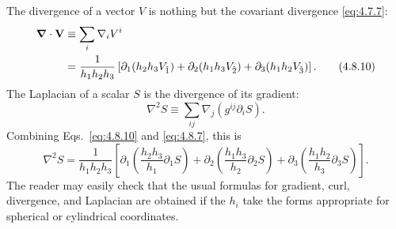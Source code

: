 The divergence of a vector \(V\) is nothing but the covariant divergence
\eqref{eq:4.7.7}:
\begin{align}
  \bm\nabla\mathbin{\cdot}\mathbf V
  &\equiv
  \sum_i\nabla_iV^i
  \notag\\
  &=
  \frac{1}{h_1h_2h_3}
  \left[
    \partial_1(h_2h_3V_{\hat1})
    +\partial_2(h_1h_3V_{\hat2})
    +\partial_3(h_1h_2V_{\hat3})
  \right].
  \tag{4.8.10}\label{eq:4.8.10}
\end{align}
The Laplacian of a scalar \(S\) is the divergence of its gradient:
\begin{equation}
  \nabla^2S
  \equiv
  \sum_{ij}\nabla_j\!\left(g^{ij}\partial_iS\right).
  \tag{4.8.11}\label{eq:4.8.11}
\end{equation}
Combining Eqs.~\eqref{eq:4.8.10} and \eqref{eq:4.8.7}, this is
\begin{equation}
  \nabla^2S
  =
  \frac{1}{h_1h_2h_3}
  \left[
    \partial_1\!\left(\frac{h_2h_3}{h_1}\partial_1S\right)
    +\partial_2\!\left(\frac{h_1h_3}{h_2}\partial_2S\right)
    +\partial_3\!\left(\frac{h_1h_2}{h_3}\partial_3S\right)
  \right].
  \tag{4.8.12}\label{eq:4.8.12}
\end{equation}
The reader may easily check that the usual formulas for gradient, curl,
divergence, and Laplacian are obtained if the \(h_i\) take the forms
appropriate for spherical or cylindrical coordinates.
